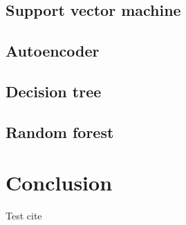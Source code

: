 \documentclass[a4paper, twoside,openright]{report}
\begin{document}
\subsection{Support vector machine}

\subsection{Autoencoder}

\subsection{Decision tree}

\subsection{Random forest}

\section{Conclusion}
Test cite\cite{test_cite}



\end{document}
